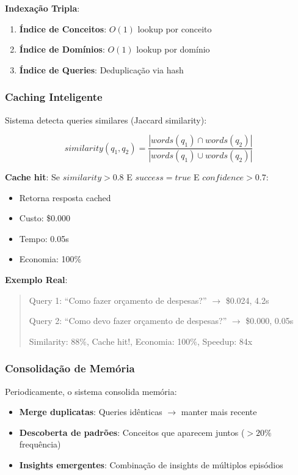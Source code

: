 \documentclass[11pt]{article}
\begin{document}
\textbf{Indexação Tripla}:
\begin{enumerate}
    \item \textbf{Índice de Conceitos}: $O(1)$ lookup por conceito
    \item \textbf{Índice de Domínios}: $O(1)$ lookup por domínio
    \item \textbf{Índice de Queries}: Deduplicação via hash
\end{enumerate}

\subsubsection{Caching Inteligente}

Sistema detecta queries similares (Jaccard similarity):

\begin{equation}
similarity(q_1, q_2) = \frac{|words(q_1) \cap words(q_2)|}{|words(q_1) \cup words(q_2)|}
\end{equation}

\textbf{Cache hit}: Se $similarity > 0.8$ E $success = true$ E $confidence > 0.7$:
\begin{itemize}
    \item Retorna resposta cached
    \item Custo: \$0.000
    \item Tempo: 0.05s
    \item Economia: 100\%
\end{itemize}

\textbf{Exemplo Real}:
\begin{quote}
Query 1: ``Como fazer orçamento de despesas?'' $\rightarrow$ \$0.024, 4.2s

Query 2: ``Como devo fazer orçamento de despesas?'' $\rightarrow$ \$0.000, 0.05s

Similarity: 88\%, Cache hit!, Economia: 100\%, Speedup: 84x
\end{quote}

\subsubsection{Consolidação de Memória}

Periodicamente, o sistema consolida memória:

\begin{itemize}
    \item \textbf{Merge duplicatas}: Queries idênticas $\rightarrow$ manter mais recente
    \item \textbf{Descoberta de padrões}: Conceitos que aparecem juntos ($>20\%$ frequência)
    \item \textbf{Insights emergentes}: Combinação de insights de múltiplos episódios
\end{itemize}
\end{document}
